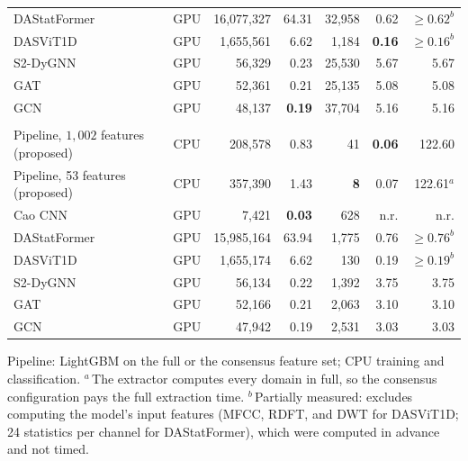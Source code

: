 \begin{table}[!htbp]
\begin{tabularx}{\textwidth}{@{}>{\raggedright\arraybackslash}X c r r r r r@{}}
		DAStatFormer~\cite{dione2026dastatformer} & GPU & 16{,}077{,}327 & 64.31 & 32{,}958 & 0.62 & $\geq 0.62^{b}$\\
		DASViT1D~\cite{dione2025intrusion}        & GPU & 1{,}655{,}561 & 6.62 & 1{,}184 & \textbf{0.16} & $\geq 0.16^{b}$\\
		S2-DyGNN~\cite{jeong2026s2dygnn}          & GPU & 56{,}329 & 0.23 & 25{,}530 & 5.67 & 5.67\\
		GAT~\cite{jeong2026s2dygnn,shahabudin2024gnn} & GPU & 52{,}361 & 0.21 & 25{,}135 & 5.08 & 5.08\\
		GCN~\cite{jeong2026s2dygnn,shahabudin2024gnn} & GPU & 48{,}137 & \textbf{0.19} & 37{,}704 & 5.16 & 5.16\\
		\midrule
		\multicolumn{7}{@{}l}{\textit{Cao \etal\ 2023}}\\[2pt]
		Pipeline, $1{,}002$ features (proposed) & CPU & 208{,}578 & 0.83 & 41 & \textbf{0.06} & 122.60\\
		Pipeline, 53 features (proposed) & CPU & 357{,}390 & 1.43 & \textbf{8} & 0.07 & 122.61$^{a}$\\
		Cao CNN~\cite{caoxin2023opendataset} & GPU & 7{,}421 & \textbf{0.03} & 628 & n.r. & n.r.\\
		DAStatFormer~\cite{dione2026dastatformer} & GPU & 15{,}985{,}164 & 63.94 & 1{,}775 & 0.76 & $\geq 0.76^{b}$\\
		DASViT1D~\cite{dione2025intrusion}        & GPU & 1{,}655{,}174 & 6.62 & 130 & 0.19 & $\geq 0.19^{b}$\\
		S2-DyGNN~\cite{jeong2026s2dygnn}          & GPU & 56{,}134 & 0.22 & 1{,}392 & 3.75 & 3.75\\
		GAT~\cite{jeong2026s2dygnn,shahabudin2024gnn} & GPU & 52{,}166 & 0.21 & 2{,}063 & 3.10 & 3.10\\
		GCN~\cite{jeong2026s2dygnn,shahabudin2024gnn} & GPU & 47{,}942 & 0.19 & 2{,}531 & 3.03 & 3.03\\
		\bottomrule
	\end{tabularx}
	\par\smallskip
	\begin{minipage}{\textwidth}\scriptsize
	Pipeline: LightGBM on the full or the consensus feature set; CPU training and classification. $^{a}$\,The extractor computes every domain in full, so the consensus configuration pays the full extraction time. $^{b}$\,Partially measured: excludes computing the model's input features (MFCC, RDFT, and DWT for DASViT1D; 24 statistics per channel for DAStatFormer), which were computed in advance and not timed.
	\end{minipage}
\end{table}

